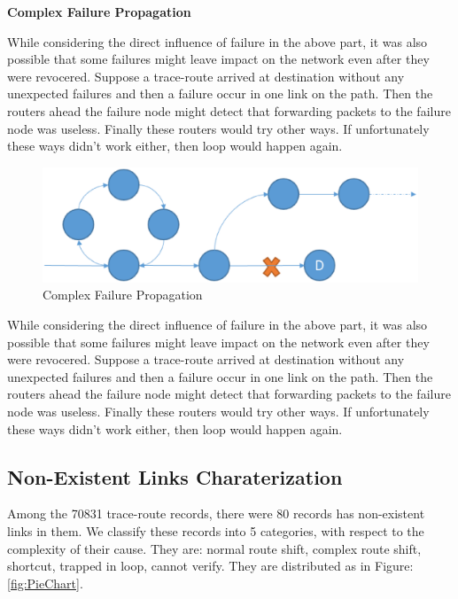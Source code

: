 \documentclass[conference, twocolumn, oneside, 10pt]{IEEEtran}
\begin{document}
\textbf{Complex Failure Propagation}

While considering the direct influence of failure in the above part, it was also possible that some failures might leave impact on the network even after they were revocered. Suppose a trace-route arrived at destination without any unexpected failures and then a failure occur in one link on the path. Then the routers ahead the failure node might detect that forwarding packets to the failure node was useless. Finally these routers would try other ways. If unfortunately these ways didn't work either, then loop would happen again.    

\begin{figure}[h!]
\centering
\includegraphics[scale=0.4]{plot/complex_failure_propagation.eps}
\caption{Complex Failure Propagation}
\label{fig:asdf4}
\end{figure}

While considering the direct influence of failure in the above part, it was also possible that some failures might leave impact on the network even after they were revocered. Suppose a trace-route arrived at destination without any unexpected failures and then a failure occur in one link on the path. Then the routers ahead the failure node might detect that forwarding packets to the failure node was useless. Finally these routers would try other ways. If unfortunately these ways didn't work either, then loop would happen again.    


\subsection{Non-Existent Links Charaterization}

Among the 70831 trace-route records, there were 80 records has non-existent links in them. We classify these records into 5 categories, with respect to the complexity of their cause. They are: normal route shift, complex route shift, shortcut, trapped in loop, cannot verify. They are distributed as in Figure:\ref{fig:PieChart}.
\end{document}
